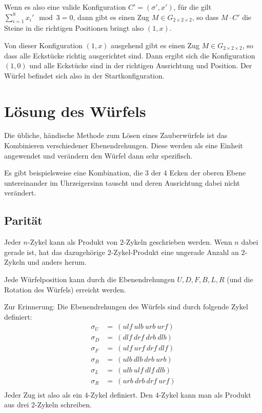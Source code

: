 \documentclass[12pt,a4paper, usenames, dvipsnames]{article}
\newcommand{\Gtwo}{\ensuremath{G_{2\times 2\times 2}}}
\begin{document}
Wenn es also eine valide Konfiguration $C'=(\sigma', x')$, für die gilt $\sum_{i = 1}^{8} x_i' \mod 3 = 0$, dann gibt es einen Zug $M \in \Gtwo$, so dass $M \cdot C'$ die Steine in die richtigen Positionen bringt also $(1,x)$. 

Von dieser Konfiguration $(1,x)$ ausgehend gibt es einen Zug $M \in \Gtwo$, so dass alle Eckstücke richtig ausgerichtet sind. Dann ergibt sich die Konfiguration $(1, 0)$ und alle Eckstücke sind in der richtigen Ausrichtung und Position. Der Würfel befindet sich also in der Startkonfiguration. 
%
%
%
%
%
%
%
%
%
%
%
%
%
%
%
%
%
%
%
%
\newpage


\section{Lösung des Würfels}

Die übliche, händische Methode zum Lösen eines Zauberwürfels ist das Kombinieren verschiedener Ebenendrehungen. Diese werden als eine Einheit angewendet und verändern den Würfel dann sehr spezifisch. 


Es gibt beispielsweise eine Kombination, die 3 der 4 Ecken der oberen Ebene untereinander im Uhrzeigersinn tauscht und deren Ausrichtung dabei nicht verändert. 

%
%
%
%
%
%
%
%
%
%
%
%
%
%
%
%
%
%
%
%
\subsection*{Parität}

Jeder $n$-Zykel kann als Produkt von $2$-Zykeln geschrieben werden. Wenn $n$ dabei gerade ist, hat das dazugehörige $2$-Zykel-Produkt eine ungerade Anzahl an $2$-Zykeln und anders herum. \cite{TD}


Jede Würfelposition kann durch die Ebenendrehungen $U, D, F, B, L, R$ (und die Rotation des Würfels) erreicht werden. 


Zur Erinnerung: Die Ebenendrehungen des Würfels sind durch folgende Zykel definiert:
\begin{align*}
\sigma_U & =\ (ulf \ ulb \ urb \ urf) \\
\sigma_D & =\ (dlf \ drf \ drb \ dlb) \\
\sigma_F & =\ (ulf \ urf \ drf \ dlf) \\
\sigma_B & =\ (ulb \ dlb \ drb \ urb) \\
\sigma_L & =\ (ulb \ ulf \ dlf \ dlb) \\
\sigma_R & =\ (urb \ drb \ drf \ urf) \\
\end{align*}
Jeder Zug ist also als ein $4$-Zykel definiert. Den $4$-Zykel kann man als Produkt aus drei $2$-Zykeln schreiben. 
\end{document}
